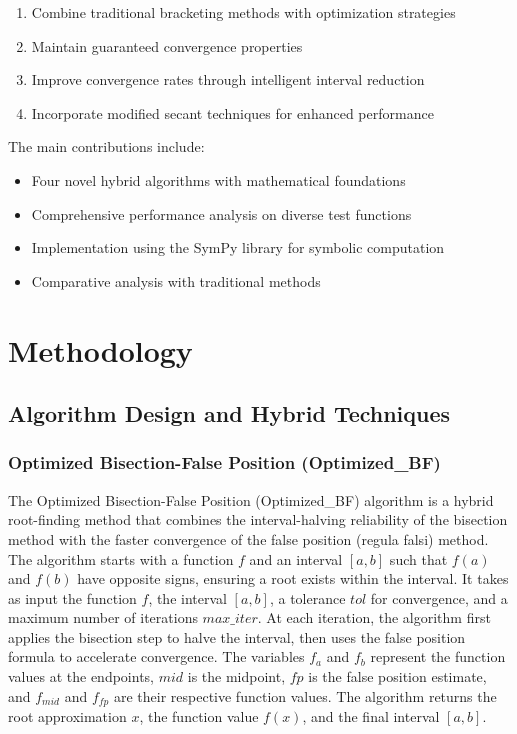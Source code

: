 \documentclass[11pt,a4paper]{article}
\begin{document}
\begin{enumerate}
    \item Combine traditional bracketing methods with optimization strategies
    \item Maintain guaranteed convergence properties
    \item Improve convergence rates through intelligent interval reduction
    \item Incorporate modified secant techniques for enhanced performance
\end{enumerate}

The main contributions include:
\begin{itemize}
    \item Four novel hybrid algorithms with mathematical foundations
    \item Comprehensive performance analysis on diverse test functions
    \item Implementation using the SymPy library for symbolic computation
    \item Comparative analysis with traditional methods
\end{itemize}

\section{Methodology}

\subsection{Algorithm Design and Hybrid Techniques}

\subsubsection{Optimized Bisection-False Position (Optimized\_BF)}

The Optimized Bisection-False Position (Optimized\_BF) algorithm is a hybrid root-finding method that combines the interval-halving reliability of the bisection method with the faster convergence of the false position (regula falsi) method. The algorithm starts with a function $f$ and an interval $[a, b]$ such that $f(a)$ and $f(b)$ have opposite signs, ensuring a root exists within the interval. It takes as input the function $f$, the interval $[a, b]$, a tolerance $tol$ for convergence, and a maximum number of iterations $max\_iter$. At each iteration, the algorithm first applies the bisection step to halve the interval, then uses the false position formula to accelerate convergence. The variables $f_a$ and $f_b$ represent the function values at the endpoints, $mid$ is the midpoint, $fp$ is the false position estimate, and $f_{mid}$ and $f_{fp}$ are their respective function values. The algorithm returns the root approximation $x$, the function value $f(x)$, and the final interval $[a, b]$.
\end{document}
